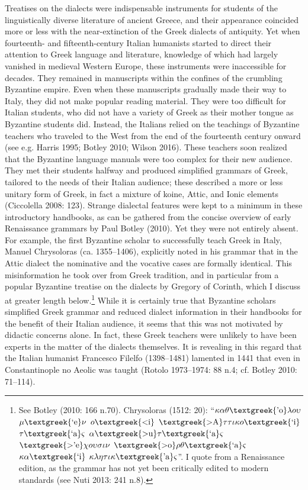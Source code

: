 \begin{styleStandard}
Treatises on the dialects were indispensable instruments for students of the linguistically diverse literature of ancient Greece, and their appearance coincided more or less with the near-extinction of the Greek dialects of antiquity. Yet when fourteenth- and fifteenth-century Italian humanists started to direct their attention to Greek language and literature, knowledge of which had largely vanished in medieval Western Europe, these instruments were inaccessible for decades. They remained in manuscripts within the confines of the crumbling Byzantine empire. Even when these manuscripts gradually made their way to Italy, they did not make popular reading material. They were too difficult for Italian students, who did not have a variety of Greek as their mother tongue as Byzantine students did. Instead, the Italians relied on the teachings of Byzantine teachers who traveled to the West from the end of the fourteenth century onward (see e.g. Harris 1995; Botley 2010; Wilson 2016). These teachers soon realized that the Byzantine language manuals were too complex for their new audience. They met their students halfway and produced simplified grammars of Greek, tailored to the needs of their Italian audience; these described a more or less unitary form of Greek, in fact a mixture of koine, Attic, and Ionic elements (Ciccolella 2008: 123). Strange dialectal features were kept to a minimum in these introductory handbooks, as can be gathered from the concise overview of early Renaissance grammars by Paul Botley (2010). Yet they were not entirely absent. For example, the first Byzantine scholar to successfully teach Greek in Italy, Manuel Chrysoloras (ca. 1355–1406), explicitly noted in his grammar that in the Attic dialect the nominative and the vocative cases are formally identical. This misinformation he took over from Greek tradition, and in particular from a popular Byzantine treatise on the dialects by Gregory of Corinth, which I discuss at greater length below.\footnote{ See Botley (2010: 166 n.70). Chrysoloras (1512: 20): “$\kappa \alpha \theta \text{\textgreek{'o}}\lambda o\upsilon $ $\mu \text{\textgreek{`e}}\nu $ $o\text{\textgreek{<i}}$ $\text{\textgreek{>A}}\tau \tau \iota \kappa o\text{\textgreek{`i}}$ $\tau \text{\textgreek{`a}}\varsigma $ $\alpha \text{\textgreek{>u}}\tau \text{\textgreek{`a}}\varsigma $ $\text{\textgreek{>'e}}\chi o\upsilon \sigma \iota \nu $ $\text{\textgreek{>o}}\rho \theta \text{\textgreek{`a}}\varsigma $ $\kappa \alpha \text{\textgreek{`i}}$ $\kappa \lambda \eta \tau \iota \kappa \text{\textgreek{'a}}\varsigma $”. I quote from a Renaissance edition, as the grammar has not yet been critically edited to modern standards (see Nuti 2013: 241 n.8).} While it is certainly true that Byzantine scholars simplified Greek grammar and reduced dialect information in their handbooks for the benefit of their Italian audience, it seems that this was not motivated by didactic concerns alone. In fact, these Greek teachers were unlikely to have been experts in the matter of the dialects themselves. It is revealing in this regard that the Italian humanist Francesco Filelfo (1398–1481) lamented in 1441 that even in Constantinople no Aeolic was taught (Rotolo 1973–1974: 88 n.4; cf. Botley 2010: 71–114).

\end{styleStandard}
